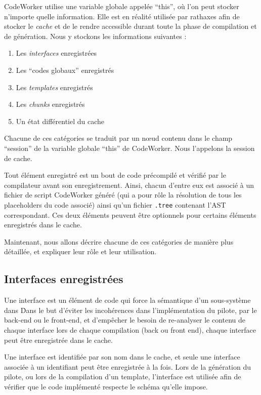 \documentclass[french]{rtxreport}
\begin{document}
CodeWorker utilise une variable globale appelée ``this'', où l'on peut stocker
n'importe quelle information. Elle est en réalité utilisée par rathaxes afin de
stocker le \emph{cache} et de le rendre accessible durant toute la phase de
compilation et de génération. Nous y stockons les informations suivantes :
\begin{enumerate}
    \item Les \emph{interfaces} enregistrées
    \item Les ``codes globaux'' enregistrés
    \item Les \emph{templates} enregistrés
    \item Les \emph{chunks} enregistrés
    \item Un état différentiel du cache
\end{enumerate}

Chacune de ces catégories se traduit par un nœud contenu dans le champ
``session'' de la variable globale ``this'' de CodeWorker. Nous l'appelons la
session de cache.

Tout élément enregistré est un bout de code précompilé et vérifié par le
compilateur avant son enregistrement. Ainsi, chacun d'entre eux est associé à
un fichier de script CodeWorker généré (qui a pour rôle la résolution de tous
les placeholders du code associé) ainsi qu'un fichier \texttt{.tree} contenant
l'AST correspondant. Ces deux éléments peuvent être optionnels pour certains
éléments enregistrés dans le cache.

Maintenant, nous allons décrire chacune de ces catégories de manière plus
détaillée, et expliquer leur rôle et leur utilisation.


\subsection{Interfaces enregistrées}

Une interface est un élément de code qui force la sémantique d'un sous-système
dans \rtx\. Dans le but d'éviter les incohérences dans l'implémentation du
pilote, par le back-end ou le front-end, et d'empêcher le besoin de re-analyser
le contenu de chaque interface lors de chaque compilation (back ou front end),
chaque interface peut être enregistrée dans le cache.

Une interface est identifiée par son nom dans le cache, et seule une interface
associée à un identifiant peut être enregistrée à la fois. Lors de la
génération du pilote, ou lors de la compilation d'un template, l'interface est
utilisée afin de vérifier que le code implémenté respecte le schéma qu'elle
impose.
\end{document}
